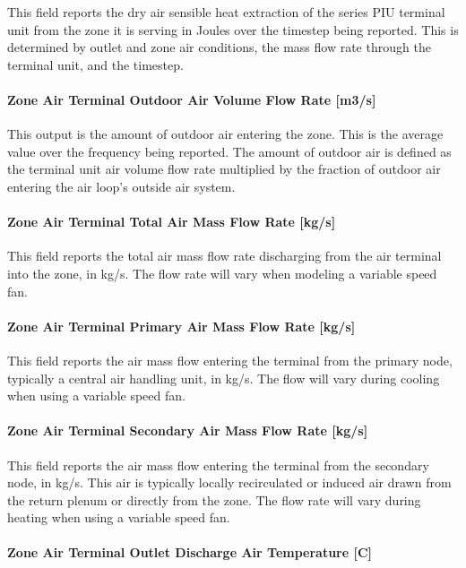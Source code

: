 This field reports the dry air sensible heat extraction of the series PIU terminal unit from the zone it is serving in Joules over the timestep being reported. This is determined by outlet and zone air conditions, the mass flow rate through the terminal unit, and the timestep.

\paragraph{Zone Air Terminal Outdoor Air Volume Flow Rate {[}m3/s{]}}

This output is the amount of outdoor air entering the zone. This is the average value over the frequency being reported. The amount of outdoor air is defined as the terminal unit air volume flow rate multiplied by the fraction of outdoor air entering the air loop's outside air system.

\paragraph{Zone Air Terminal Total Air Mass Flow Rate {[}kg/s{]}}

This field reports the total air mass flow rate discharging from the air terminal into the zone, in kg/s. The flow rate will vary when modeling a variable speed fan.

\paragraph{Zone Air Terminal Primary Air Mass Flow Rate {[}kg/s{]}}

This field reports the air mass flow entering the terminal from the primary node, typically a central air handling unit, in kg/s. The flow will vary during cooling when using a variable speed fan.

\paragraph{Zone Air Terminal Secondary Air Mass Flow Rate {[}kg/s{]}}

This field reports the air mass flow entering the terminal from the secondary node, in kg/s. This air is typically locally recirculated or induced air drawn from the return plenum or directly from the zone. The flow rate will vary during heating when using a variable speed fan.

\paragraph{Zone Air Terminal Outlet Discharge Air Temperature {[}C{]}}

